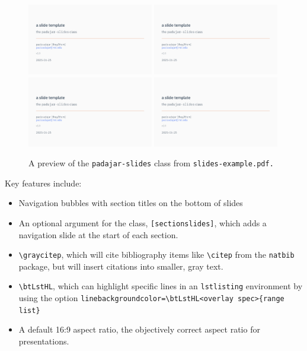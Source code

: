 \documentclass[11pt]{padajar-memo}
\newcommand{\ttslash}[1]{\texttt{\textbackslash #1}}
\begin{document}
	\begin{figure}[ht]
		\caption{A preview of the \texttt{padajar-slides} class from \texttt{slides-example.pdf.}}
		\begin{center}
		\includegraphics[width=0.49\textwidth,page=1]{slides/slides-example.pdf}
		\includegraphics[width=0.49\textwidth,page=4]{slides/slides-example.pdf}
		\includegraphics[width=0.49\textwidth,page=5]{slides/slides-example.pdf}
		\includegraphics[width=0.49\textwidth,page=6]{slides/slides-example.pdf}
		\end{center}
	\end{figure}

Key features include:
\begin{itemize}
	\item Navigation bubbles with section titles on the bottom of slides
	\item An optional argument for the class, \texttt{[sectionslides]}, which adds a navigation slide at the start of each section.
	\item \ttslash{graycitep}, which will cite bibliography items like \ttslash{citep} from the \texttt{natbib} package, but will insert citations into smaller, gray text.
	\item \ttslash{btLstHL}, which can highlight specific lines in an \texttt{lstlisting} environment by using the option	\texttt{linebackgroundcolor={\textbackslash btLstHL<overlay spec>\{range list\}}}
	\item A default 16:9 aspect ratio, the objectively correct aspect ratio for presentations.
\end{itemize}
\end{document}
